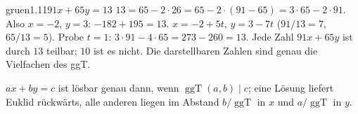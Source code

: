 \begin{loesungkarte}{gruen}{1.11}{$91x + 65y = 13$}
$13 = 65 - 2\cdot26 = 65 - 2\cdot(91 - 65) = 3\cdot65 - 2\cdot91$. Also $x = -2$, $y = 3$: $-182 + 195 = 13$. \checkmark
{}
$x = -2 + 5t$, $y = 3 - 7t$ ($91/13 = 7$, $65/13 = 5$). Probe $t = 1$: $3\cdot91 - 4\cdot65 = 273 - 260 = 13$. \checkmark
{}
Jede Zahl $91x + 65y$ ist durch $13$ teilbar; $10$ ist es nicht. Die darstellbaren Zahlen sind genau die Vielfachen des ggT.
\begin{mitnehmen}\kastentext
$ax + by = c$ ist lösbar genau dann, wenn $\operatorname{ggT}(a, b)\mid c$; eine Lösung liefert Euklid rückwärts, alle anderen liegen im Abstand $b/\operatorname{ggT}$ in $x$ und $a/\operatorname{ggT}$ in $y$.
\end{mitnehmen}
\end{loesungkarte}

